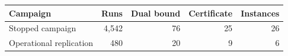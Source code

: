 \begin{tabular}{lrrrr}
\toprule
Campaign & Runs & Dual bound & Certificate & Instances \\
\midrule
Stopped campaign & 4,542 & 76 & 25 & 26 \\
Operational replication & 480 & 20 & 9 & 6 \\
\bottomrule
\end{tabular}

